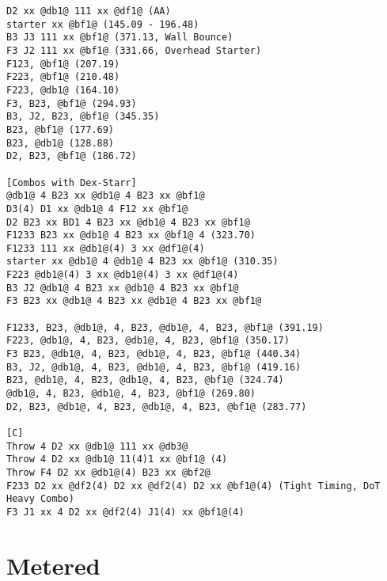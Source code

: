 \documentclass[main.tex]{subfiles}
\begin{document}
\begin{lstlisting}[language=FG]
D2 xx @db1@ 111 xx @df1@ (AA)
starter xx @bf1@ (145.09 - 196.48)
B3 J3 111 xx @bf1@ (371.13, Wall Bounce)
F3 J2 111 xx @bf1@ (331.66, Overhead Starter)
F123, @bf1@ (207.19)
F223, @bf1@ (210.48)
F223, @db1@ (164.10)
F3, B23, @bf1@ (294.93)
B3, J2, B23, @bf1@ (345.35)
B23, @bf1@ (177.69)
B23, @db1@ (128.88)
D2, B23, @bf1@ (186.72)

[Combos with Dex-Starr]
@db1@ 4 B23 xx @db1@ 4 B23 xx @bf1@
D3(4) D1 xx @db1@ 4 F12 xx @bf1@
D2 B23 xx BD1 4 B23 xx @db1@ 4 B23 xx @bf1@
F1233 B23 xx @db1@ 4 B23 xx @bf1@ 4 (323.70)
F1233 111 xx @db1@(4) 3 xx @df1@(4)
starter xx @db1@ 4 @db1@ 4 B23 xx @bf1@ (310.35)
F223 @db1@(4) 3 xx @db1@(4) 3 xx @df1@(4)
B3 J2 @db1@ 4 B23 xx @db1@ 4 B23 xx @bf1@
F3 B23 xx @db1@ 4 B23 xx @db1@ 4 B23 xx @bf1@

F1233, B23, @db1@, 4, B23, @db1@, 4, B23, @bf1@ (391.19)
F223, @db1@, 4, B23, @db1@, 4, B23, @bf1@ (350.17)
F3 B23, @db1@, 4, B23, @db1@, 4, B23, @bf1@ (440.34)
B3, J2, @db1@, 4, B23, @db1@, 4, B23, @bf1@ (419.16)
B23, @db1@, 4, B23, @db1@, 4, B23, @bf1@ (324.74)
@db1@, 4, B23, @db1@, 4, B23, @bf1@ (269.80)
D2, B23, @db1@, 4, B23, @db1@, 4, B23, @bf1@ (283.77)

[C]
Throw 4 D2 xx @db1@ 111 xx @db3@
Throw 4 D2 xx @db1@ 11(4)1 xx @bf1@ (4) 
Throw F4 D2 xx @db1@(4) B23 xx @bf2@
F233 D2 xx @df2(4) D2 xx @df2(4) D2 xx @bf1@(4) (Tight Timing, DoT Heavy Combo)
F3 J1 xx 4 D2 xx @df2(4) J1(4) xx @bf1@(4)
\end{lstlisting}







\section{Metered}
\end{document}
